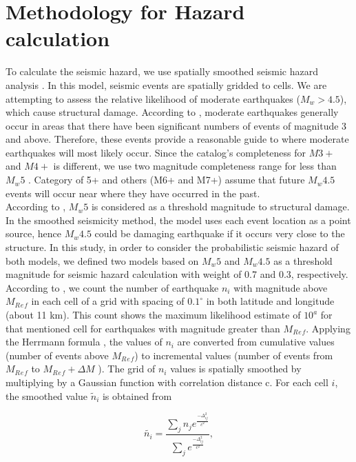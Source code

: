 \documentclass{article}
\begin{document}
\section{Methodology for Hazard calculation}

To calculate the seismic hazard, we use spatially smoothed seismic hazard analysis \citep{Frankel1995}. In this model, seismic events are spatially gridded to cells. We are attempting to assess the relative likelihood of moderate earthquakes ($M_w > 4.5$), which cause structural damage. According to \citet{Frankel1995}, moderate earthquakes generally occur in areas that there have been significant numbers of events of magnitude 3 and above. Therefore, these events provide a reasonable guide to where moderate earthquakes will most likely occur. Since the catalog's completeness for $M3+$ and $M4+$ is different, we use two magnitude completeness range for less than $M_w5$ . Category of 5+ and others (M6+ and M7+) assume that future $M_w4.5$ events will occur near where they have occurred in the past. \\
\noindent
According to \citep{BHRC2014}, $M_w5$ is considered as a threshold magnitude to structural damage. In the smoothed seismicity method, the model uses each event location as a point source, hence $M_w4.5$ could be damaging earthquake if it occurs very close to the structure. In this study, in order to consider the probabilistic seismic hazard of both models, we defined two models based on $M_w5$ and $M_w4.5$ as a threshold magnitude for seismic hazard calculation with weight of 0.7 and 0.3, respectively.\\
\noindent
According to \citet{Frankel1995}, we count the number of earthquake $n_i$ with magnitude above $M{_R{_e{_f}}}$ in each cell of a grid with spacing of $0.1^{\circ}$ in both latitude and longitude (about 11 km). This count shows the maximum likelihood estimate of $10^a$ for that mentioned cell \citep{Weichert1980, Bender1983} for earthquakes with magnitude greater than $M{_R{_e{_f}}}$. Applying the Herrmann formula \citep{Herrmann1977}, the values of $n_i$ are converted from cumulative values (number of events above $M{_R{_e{_f}}}$) to incremental values (number of events from $M{_R{_e{_f}}}$ to $M{_R{_e{_f}}} +\Delta M$ ). The grid of $n_i$ values is spatially smoothed by multiplying by a Gaussian function with correlation distance c. For each cell $i$, the smoothed value $\tilde{n}_i$ is obtained from \citet{Frankel1995}


\begin{equation}
\tilde{n_i}=\frac{\sum_{j} n_{j} e^{\frac{-\Delta_{ij}^{2}}{c^2}}}{\sum_{j} e^{\frac{-\Delta_{ij}^{2}}{c^2}}},
\end{equation}
\end{document}
